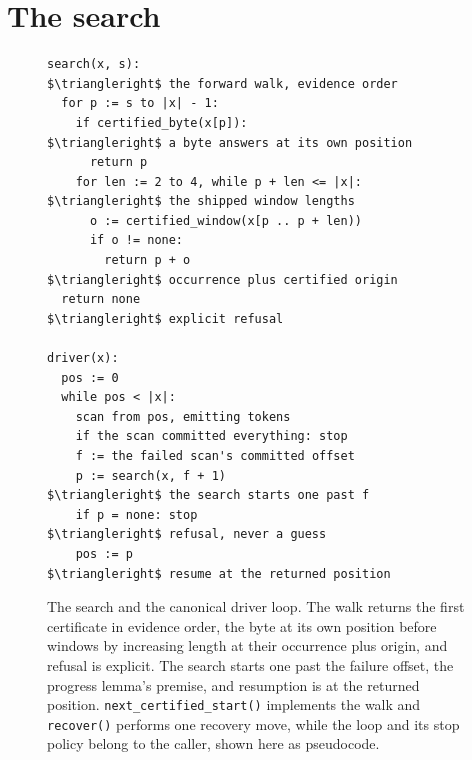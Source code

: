 \documentclass[11pt,a4paper]{article}
\theoremstyle{definition}
\theoremstyle{plain}
\theoremstyle{remark}
\newcommand{\code}[1]{\texttt{#1}}
\begin{document}
\section{The search}
\label{sec:search}

\begin{figure}[htbp]
\begin{lstlisting}[style=walk]
search(x, s):                                  $\triangleright$ the forward walk, evidence order
  for p := s to |x| - 1:
    if certified_byte(x[p]):                   $\triangleright$ a byte answers at its own position
      return p
    for len := 2 to 4, while p + len <= |x|:   $\triangleright$ the shipped window lengths
      o := certified_window(x[p .. p + len))
      if o != none:
        return p + o                           $\triangleright$ occurrence plus certified origin
  return none                                  $\triangleright$ explicit refusal

driver(x):
  pos := 0
  while pos < |x|:
    scan from pos, emitting tokens
    if the scan committed everything: stop
    f := the failed scan's committed offset
    p := search(x, f + 1)                      $\triangleright$ the search starts one past f
    if p = none: stop                          $\triangleright$ refusal, never a guess
    pos := p                                   $\triangleright$ resume at the returned position
\end{lstlisting}
\caption{The search and the canonical driver loop. The walk returns the first certificate in evidence order, the byte at
its own position before windows by increasing length at their occurrence plus origin, and refusal is explicit. The
search starts one past the failure offset, the progress lemma's premise, and resumption is at the returned position.
\code{next\_certified\_start()} implements the walk and \code{recover()} performs one recovery move, while the loop and
its stop policy belong to the caller, shown here as pseudocode.}
\label{fig:walk}
\end{figure}
\end{document}

